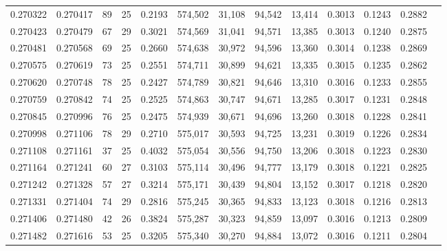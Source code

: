 \begin{tabular}{rrrrrrrrrrrrr}
0.270322 & 0.270417 &  89 &  25 &                                     0.2193 & 574,502 &  31,108 &  94,542 &  13,414 & 0.3013 & 0.1243 & 0.2882 \\
0.270423 & 0.270479 &  67 &  29 &                                     0.3021 & 574,569 &  31,041 &  94,571 &  13,385 & 0.3013 & 0.1240 & 0.2875 \\
0.270481 & 0.270568 &  69 &  25 &                                     0.2660 & 574,638 &  30,972 &  94,596 &  13,360 & 0.3014 & 0.1238 & 0.2869 \\
0.270575 & 0.270619 &  73 &  25 &                                     0.2551 & 574,711 &  30,899 &  94,621 &  13,335 & 0.3015 & 0.1235 & 0.2862 \\
0.270620 & 0.270748 &  78 &  25 &                                     0.2427 & 574,789 &  30,821 &  94,646 &  13,310 & 0.3016 & 0.1233 & 0.2855 \\
0.270759 & 0.270842 &  74 &  25 &                                     0.2525 & 574,863 &  30,747 &  94,671 &  13,285 & 0.3017 & 0.1231 & 0.2848 \\
0.270845 & 0.270996 &  76 &  25 &                                     0.2475 & 574,939 &  30,671 &  94,696 &  13,260 & 0.3018 & 0.1228 & 0.2841 \\
0.270998 & 0.271106 &  78 &  29 &                                     0.2710 & 575,017 &  30,593 &  94,725 &  13,231 & 0.3019 & 0.1226 & 0.2834 \\
0.271108 & 0.271161 &  37 &  25 &                                     0.4032 & 575,054 &  30,556 &  94,750 &  13,206 & 0.3018 & 0.1223 & 0.2830 \\
0.271164 & 0.271241 &  60 &  27 &                                     0.3103 & 575,114 &  30,496 &  94,777 &  13,179 & 0.3018 & 0.1221 & 0.2825 \\
0.271242 & 0.271328 &  57 &  27 &                                     0.3214 & 575,171 &  30,439 &  94,804 &  13,152 & 0.3017 & 0.1218 & 0.2820 \\
0.271331 & 0.271404 &  74 &  29 &                                     0.2816 & 575,245 &  30,365 &  94,833 &  13,123 & 0.3018 & 0.1216 & 0.2813 \\
0.271406 & 0.271480 &  42 &  26 &                                     0.3824 & 575,287 &  30,323 &  94,859 &  13,097 & 0.3016 & 0.1213 & 0.2809 \\
0.271482 & 0.271616 &  53 &  25 &                                     0.3205 & 575,340 &  30,270 &  94,884 &  13,072 & 0.3016 & 0.1211 & 0.2804 \\

\end{tabular}
